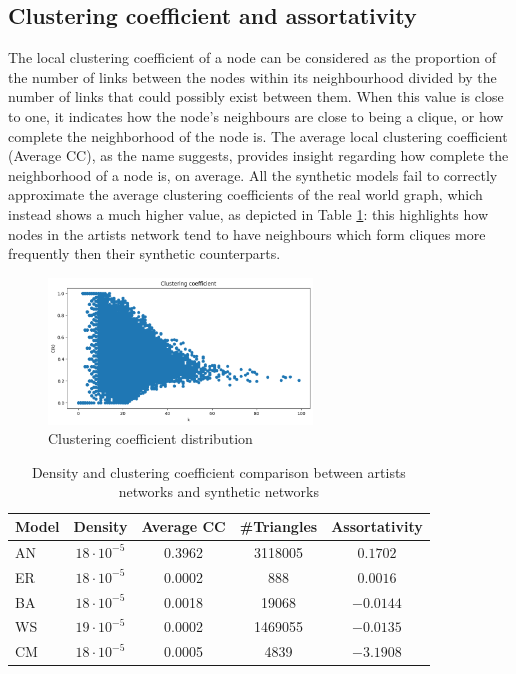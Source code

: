 \documentclass[sigchi]{acmart}
\begin{document}
\subsection{Clustering coefficient and assortativity}
The local clustering coefficient of a node can be considered as the proportion of the number of links between the nodes within its neighbourhood divided by the number of links that could possibly exist between them. When this value is close to one, it indicates how the node's neighbours are close to being a clique, or how complete the neighborhood of the node is. The average local clustering coefficient (Average CC), as the name suggests, provides insight regarding how complete the neighborhood of a node is, on average. All the synthetic models fail to correctly approximate the average clustering coefficients of the real world graph, which instead shows a much higher value, as depicted in Table \ref{table:density_comp}: this highlights how nodes in the artists network tend to have neighbours which form cliques more frequently then their synthetic counterparts.

\begin{figure}[H]
\centering
\includegraphics[width=7cm]{img/graph_clust_coeff.png}
\caption{Clustering coefficient distribution}
\label{fig: clust_distr}
\end{figure}

\renewcommand{\arraystretch}{1.3}
\begin{table}[H]
\begin{center}
\scriptsize
\begin{tabular}{ |l|c|c|c|c| } 
 \hline
 \textbf{Model} & \textbf{Density} & \textbf{Average CC} & \textbf{\#Triangles} & \textbf{Assortativity}\\
 \hline
 AN & $18\cdot10^{-5}$ & 0.3962 & 3118005 &
 $0.1702$\\
 ER & $18\cdot10^{-5}$ & 0.0002 & 888 & $0.0016$\\
 BA &  $18\cdot10^{-5}$ & 0.0018 & 19068 & $-0.0144$\\
 WS & $19\cdot10^{-5}$ & 0.0002 & 1469055 & $-0.0135$\\
 CM & $18\cdot10^{-5}$ & 0.0005 & 4839 & $-3.1908$\\
 
 \hline
\end{tabular}
\end{center}
\caption{\label{table:density_comp} Density and clustering coefficient comparison between artists networks and synthetic networks}
\end{table}
\end{document}
